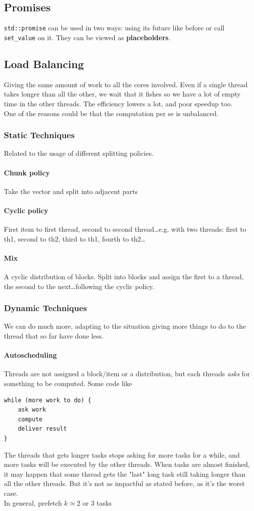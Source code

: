 \documentclass[10pt]{report}
\begin{document}
\subsection{Promises}
\texttt{std::promise} can be used in two ways: using its future like before or call \texttt{set\_value} on it. They can be viewed as \textbf{placeholders}.
\subsection{Load Balancing} Giving the same amount of work to all the cores involved. Even if a single thread takes longer than all the other, we wait that it fishes so we have a lot of empty time in the other threads. The efficiency lowers a lot, and poor speedup too.\\
One of the reasons could be that the computation per se is unbalanced.
\subsubsection{Static Techniques}
Related to the usage of different splitting policies.
\paragraph{Chunk policy} Take the vector and split into adjacent parts
\paragraph{Cyclic policy} First item to first thread, second to second thread\ldots e.g. with two threads: first to th1, second to th2, third to th1, fourth to th2\ldots
\paragraph{Mix} A cyclic distribution of blocks. Split into blocks and assign the first to a thread, the second to the next\ldots following the cyclic policy.
\subsubsection{Dynamic Techniques}
We can do much more, adapting to the situation giving more things to do to the thread that so far have done less.
\paragraph{Autoscheduling} Threads are not assigned a block/item or a distribution, but each threads \textit{asks} for something to be computed. Some code like \begin{lstlisting}
while (more work to do) {
	ask work
	compute
	deliver result
}
\end{lstlisting}
The threads that gets longer tasks stops asking for more tasks for a while, and more tasks will be executed by the other threads. When tasks are almost finished, it may happen that some thread gets the "last" long task still taking longer than all the other threads. But it's not as impactful as stated before, as it's the worst case.\\
In general, prefetch $k \simeq 2$ or $3$ tasks
\end{document}

